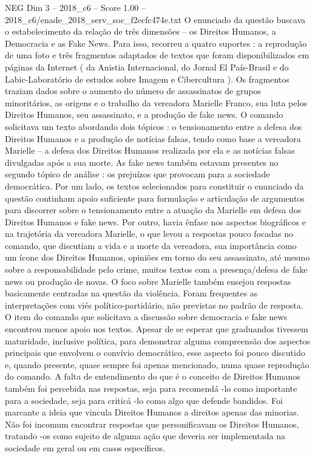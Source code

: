 \begin{textsample}{NEG Dim 3 – 2018\_c6 – Score 1.00 – 2018\_c6/enade\_2018\_serv\_soc\_f2ecfc474e.txt}
O enunciado da questão buscava o estabelecimento da relação de três dimensões – os Direitos Humanos, a Democracia e as Fake News.
Para isso, recorreu a quatro suportes : a reprodução de uma foto e três fragmentos adaptados de textos que foram disponibilizados em páginas da Internet ( da Anistia Internacional, do Jornal El País-Brasil e do Labic-Laboratório de estudos sobre Imagem e Cibercultura ).
Os fragmentos traziam dados sobre o aumento do número de assassinatos de grupos minoritários, as origens e o trabalho da vereadora Marielle Franco, sua luta pelos Direitos Humanos, seu assassinato, e a produção de fake news.
O comando solicitava um texto abordando dois tópicos : o tensionamento entre a defesa dos Direitos Humanos e a produção de notícias falsas, tendo como base a vereadora Marielle – a defesa dos Direitos Humanos realizada por ela e as notícias falsas divulgadas após a sua morte.
As fake news também estavam presentes no segundo tópico de análise : os prejuízos que provocam para a sociedade democrática.
Por um lado, os textos selecionados para constituir o enunciado da questão continham apoio suficiente para formulação e articulação de argumentos para discorrer sobre o tensionamento entre a atuação da Marielle em defesa dos Direitos Humanos e fake news.
Por outro, havia ênfase nos aspectos biográficos e na trajetória da vereadora Marielle, o que levou a respostas pouco focadas no comando, que discutiam a vida e a morte da vereadora, sua importância como um ícone dos Direitos Humanos, opiniões em torno do seu assassinato, até mesmo sobre a responsabilidade pelo crime, muitos textos com a presença/defesa de fake news ou produção de novas.
O foco sobre Marielle também ensejou respostas basicamente centradas na questão da violência.
Foram frequentes as interpretações com viés político-partidário, não previstas no padrão de resposta.
O item do comando que solicitava a discussão sobre democracia e fake news encontrou menos apoio nos textos.
Apesar de se esperar que graduandos tivessem maturidade, inclusive política, para demonstrar alguma compreensão dos aspectos principais que envolvem o convívio democrático, esse aspecto foi pouco discutido e, quando presente, quase sempre foi apenas mencionado, numa quase reprodução do comando.
A falta de entendimento do que é o conceito de Direitos Humanos também foi percebida nas respostas, seja para recomendá -lo como importante para a sociedade, seja para criticá -lo como algo que defende bandidos.
Foi marcante a ideia que vincula Direitos Humanos a direitos apenas das minorias.
Não foi incomum encontrar respostas que personificavam os Direitos Humanos, tratando -os como sujeito de alguma ação que deveria ser implementada na sociedade em geral ou em casos específicos.

\end{textsample}

